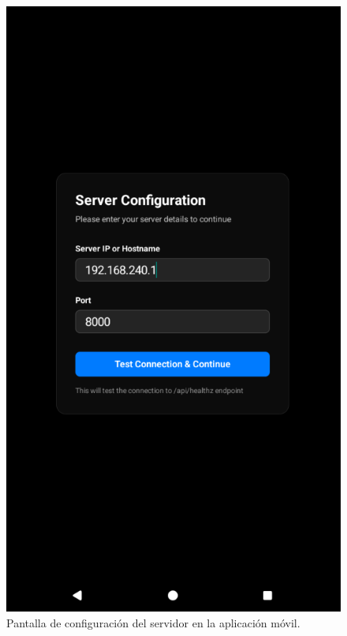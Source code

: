 \begin{figure}[h]
\begin{minipage}[t]{0.3\textwidth}
    \centering
    \includegraphics[width=\textwidth]{assets/server-settings-mobile.png}
    \caption{Pantalla de configuración del servidor en la aplicación móvil.}
    \label{fig:server-settings-mobile}
  \end{minipage}
  \hfill
  \begin{minipage}[t]{0.3\textwidth}
    \centering

\end{minipage}
\end{figure}
